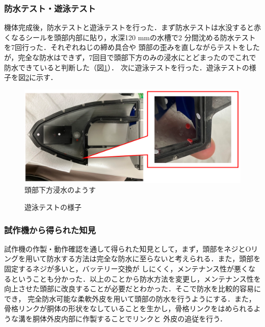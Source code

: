 \subsubsection{防水テスト・遊泳テスト}
機体完成後，防水テストと遊泳テストを行った．まず防水テストは水没すると赤くなるシールを頭部内部に貼り，水深120 mmの水槽で2 分間沈める防水テストを7回行った．それぞれねじの締め具合や
頭部の歪みを直しながらテストをしたが，完全な防水はできず，7回目で頭部下方のみの浸水にとどまったのでこれで防水できていると判断した（図\ref{fig:bousuitest_sisaku}）．
次に遊泳テストを行った．遊泳テストの様子を図\ref{fig:test_sisaku}に示す．

\begin{figure}[t]
    \centering
    \includegraphics[width=0.80\linewidth]{chapters/picture/bousuitest.png}
    \caption{頭部下方浸水のようす}
    \label{fig:bousuitest_sisaku}
\end{figure}
\begin{figure}[t]
    \centering
    \caption{遊泳テストの様子}
    \label{fig:test_sisaku}
\end{figure}

\subsubsection{試作機から得られた知見}
試作機の作製・動作確認を通して得られた知見として，まず，頭部をネジとOリングを用いて防水する方法は完全な防水に至らないと考えられる．また，頭部を固定するネジが多いと，バッテリー交換が
しにくく，メンテナンス性が悪くなるということも分かった．以上のことから防水方法を変更し，メンテナンス性を向上させた頭部に改良することが必要だとわかった．そこで防水を比較的容易にでき，
完全防水可能な柔軟外皮を用いて頭部の防水を行うようにする．また，骨格リンクが胴体の形状をなしていることを生かし，骨格リンクをはめられるような溝を胴体外皮内部に作製することでリンクと
外皮の追従を行う．